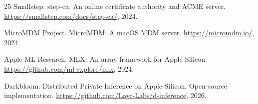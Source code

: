\documentclass[10pt,twocolumn,letterpaper]{article}
\begin{document}
\begin{thebibliography}{25}
Smallstep. step-ca: An online certificate authority and ACME server. \url{https://smallstep.com/docs/step-ca/}, 2024.

MicroMDM Project. MicroMDM: A macOS MDM server. \url{https://micromdm.io/}, 2024.

Apple ML Research. MLX: An array framework for Apple Silicon. \url{https://github.com/ml-explore/mlx}, 2024.

Darkbloom: Distributed Private Inference on Apple Silicon. Open-source implementation. \url{https://github.com/Layr-Labs/d-inference}, 2026.

\end{thebibliography}
\end{document}
